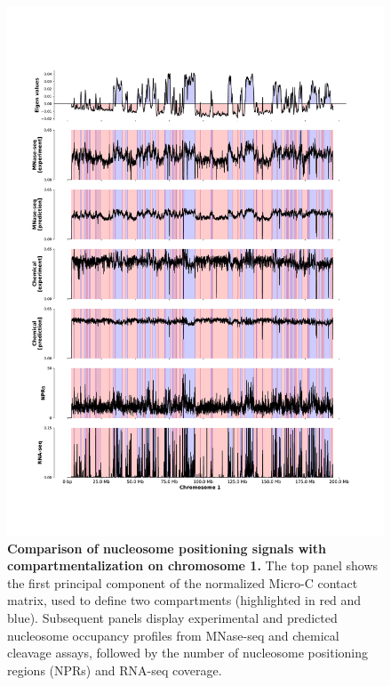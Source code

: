 \documentclass[11pt]{book}
\begin{document}
\begin{figure}[htbp]
    \centering
    \includegraphics[width=\textwidth,height=0.9\textheight,keepaspectratio, trim=2cm 3cm 2cm 3cm, clip]{Figures/Results/microc_chr1.pdf}
    \caption{\textbf{Comparison of nucleosome positioning signals with compartmentalization on chromosome 1.} 
    The top panel shows the first principal component of the normalized Micro-C contact matrix, used to define two compartments (highlighted in red and blue). 
    Subsequent panels display experimental and predicted nucleosome occupancy profiles from MNase-seq and chemical cleavage assays, followed by the number of nucleosome positioning regions (NPRs) and RNA-seq coverage.}
    \label{fig:micro-c}
\end{figure}
\end{document}
